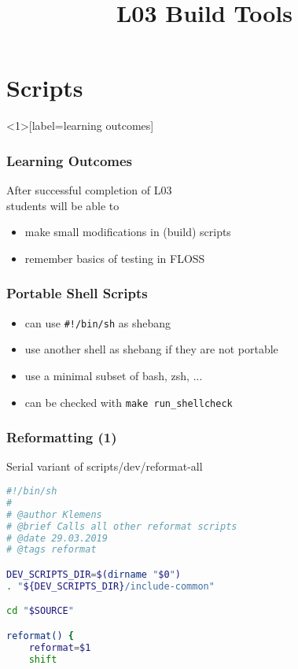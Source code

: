 

\title{L03 Build Tools}



\section{Scripts}

\begin{frame}<1>[label=learning outcomes]
	\frametitle{Learning Outcomes}
	After successful completion of L03 \\
	students will be able to

	\begin{itemize}
	\item make small modifications in (build) scripts
	\item remember basics of testing in FLOSS
	\end{itemize}
\end{frame}

\begin{frame}[fragile,label=portable shell scripts]
	\frametitle{Portable Shell Scripts}

	\begin{itemize}[<+-| alert@+>]
	\item can use \verb+#!/bin/sh+ as shebang
	\item use another shell as shebang if they are not portable
	\item use a minimal subset of bash, zsh, ...
	\item can be checked with \verb+make run_shellcheck+
	\end{itemize}
\end{frame}

\begin{frame}[fragile]
	\frametitle{Reformatting (1)}

	Serial variant of scripts/dev/reformat-all

	\begin{lstlisting}[language=sh]
#!/bin/sh
#
# @author Klemens
# @brief Calls all other reformat scripts
# @date 29.03.2019
# @tags reformat

DEV_SCRIPTS_DIR=$(dirname "$0")
. "${DEV_SCRIPTS_DIR}/include-common"

cd "$SOURCE"

reformat() {
	reformat=$1
	shift
	\end{lstlisting}
\end{frame}

